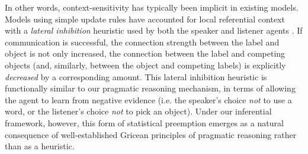 %
In other words, context-sensitivity has typically been implicit in existing models. 
Models using simple update rules have accounted for local referential context with a \emph{lateral inhibition} heuristic used by both the speaker and listener agents \cite{franke2012bidirectional,steels2005coordinating}.
If communication is successful, the connection strength between the label and object is not only increased, the connection between the label and competing objects (and, similarly, between the object and competing labels) is explicitly \emph{decreased} by a corresponding amount.
This lateral inhibition heuristic is functionally similar to our pragmatic reasoning mechanism, in terms of allowing the agent to learn from negative evidence (i.e. the speaker's choice \emph{not} to use a word, or the listener's choice \emph{not} to pick an object). 
Under our inferential framework, however, this form of statistical preemption emerges as a natural consequence of well-established Gricean principles of pragmatic reasoning rather than as a heuristic.

